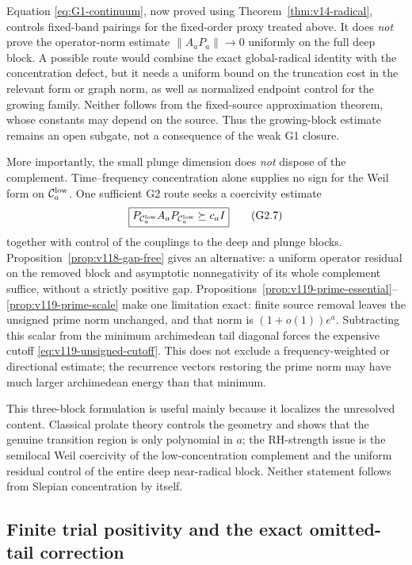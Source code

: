 \documentclass[11pt]{article}
\theoremstyle{remark}
\newcommand{\norm}[1]{\left\lVert #1\right\rVert}
\begin{document}
Equation \eqref{eq:G1-continuum}, now proved using Theorem~\ref{thm:v14-radical}, controls fixed-band pairings for the fixed-order proxy treated above. It does \emph{not} prove the operator-norm estimate $\norm{A_aP_a}\to0$ uniformly on the full deep block. A possible route would combine the exact global-radical identity with the concentration defect, but it needs a uniform bound on the truncation cost in the relevant form or graph norm, as well as normalized endpoint control for the growing family. Neither follows from the fixed-source approximation theorem, whose constants may depend on the source. Thus the growing-block estimate remains an open subgate, not a consequence of the weak G1 closure.

More importantly, the small plunge dimension does \emph{not} dispose of the complement.  Time--frequency concentration alone supplies no sign for the Weil form on $\mathcal C_a^{\rm low}$.  One sufficient G2 route seeks a coercivity estimate
\[
 \boxed{
 P_{\mathcal C_a^{\rm low}}A_aP_{\mathcal C_a^{\rm low}}\succeq c_a I
 }
 \tag{G2.7}
\]
together with control of the couplings to the deep and plunge blocks.
Proposition~\ref{prop:v118-gap-free} gives an alternative: a uniform
operator residual on the removed block and asymptotic nonnegativity of
its whole complement suffice, without a strictly positive gap.  Propositions~\ref{prop:v119-prime-essential}--\ref{prop:v119-prime-scale}
make one limitation exact: finite source removal leaves the unsigned
prime norm unchanged, and that norm is $(1+o(1))e^a$.
Subtracting this scalar from the minimum archimedean tail diagonal
forces the expensive cutoff \eqref{eq:v119-unsigned-cutoff}.
This does not exclude a frequency-weighted or directional estimate;
the recurrence vectors restoring the prime norm may have much larger
archimedean energy than that minimum.

This three-block formulation is useful mainly because it localizes the unresolved content.  Classical prolate theory controls the geometry and shows that the genuine transition region is only polynomial in $a$; the RH-strength issue is the semilocal Weil coercivity of the low-concentration complement and the uniform residual control of the entire deep near-radical block.  Neither statement follows from Slepian concentration by itself.

\subsection*{Finite trial positivity and the exact omitted-tail correction}
\end{document}
